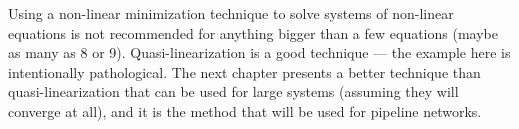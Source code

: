 Using a non-linear minimization technique to solve systems of non-linear equations is not recommended for anything bigger than a few equations (maybe as many as 8 or 9).  
Quasi-linearization is a good technique --- the example here is intentionally pathological. 
The next chapter presents a better technique than quasi-linearization that can be used for large systems (assuming they will converge at all), and it is the method that will be used for pipeline networks.
%
%

